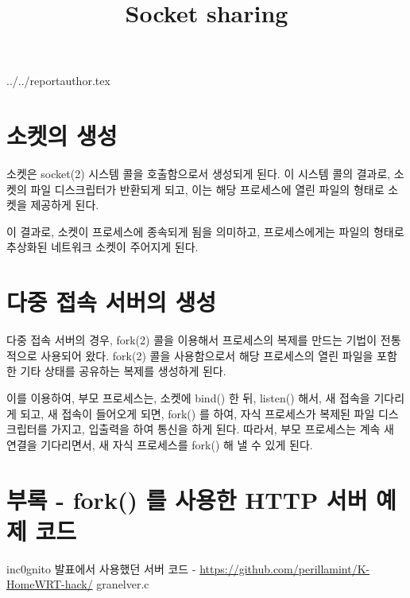 \documentclass {article}
\begin{document}
\title {Socket sharing}
 {../../reportauthor.tex}
\maketitle

\section{소켓의 생성}
소켓은 socket(2) 시스템 콜을 호출함으로서 생성되게 된다. 이 시스템 콜의 결과로, 소켓의 파일 디스크립터가 반환되게 되고, 이는 해당 프로세스에 열린 파일의 형태로 소켓을 제공하게 된다.

이 결과로, 소켓이 프로세스에 종속되게 됨을 의미하고, 프로세스에게는 파일의 형태로 추상화된 네트워크 소켓이 주어지게 된다.

\section{다중 접속 서버의 생성}
다중 접속 서버의 경우, fork(2) 콜을 이용해서 프로세스의 복제를 만드는 기법이 전통적으로 사용되어 왔다. fork(2) 콜을 사용함으로서 해당 프로세스의 열린 파일을 포함한 기타 상태를 공유하는 복제를 생성하게 된다.

이를 이용하여, 부모 프로세스는, 소켓에 bind() 한 뒤, listen() 해서, 새 접속을 기다리게 되고, 새 접속이 들어오게 되면, fork() 를 하여, 자식 프로세스가 복제된 파일 디스크립터를 가지고, 입출력을 하여 통신을 하게 된다. 따라서, 부모 프로세스는 계속 새 연결을 기다리면서, 새 자식 프로세스를 fork() 해 낼 수 있게 된다.

\section{부록 - fork() 를 사용한 HTTP 서버 예제 코드}
inc0gnito 발표에서 사용했던 서버 코드 - \url{https://github.com/perillamint/K-HomeWRT-hack/}
{granelver.c}
\end{document}
